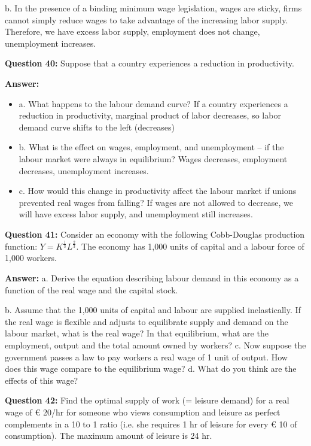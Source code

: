 \documentclass[a4paper, 11pt]{article}
\begin{document}
b. In the presence of a binding minimum wage legislation, wages are sticky, firms cannot simply reduce wages to take advantage of the increasing labor supply. Therefore, we have excess labor supply, employment does not change, unemployment increases.

\textbf{Question 40:} Suppose that a country experiences a reduction in productivity.

\textbf{Answer:}

\begin{itemize}
\item a. What happens to the labour demand curve? If a country experiences a reduction in productivity, marginal product of labor decreases, so labor demand curve shifts to the left (decreases)
\item b. What is the effect on wages, employment, and unemployment – if the labour market were always in equilibrium? Wages decreases, employment decreases, unemployment increases.
\item c. How would this change in productivity affect the labour market if unions prevented real wages from falling? If wages are not allowed to decrease, we will have excess labor supply, and unemployment still increases.
\end{itemize}

\textbf{Question 41:} Consider an economy with the following Cobb-Douglas production function: $Y = K^{\frac{1}{3}}L^{\frac{2}{3}}$. The economy has 1,000 units of capital and a labour force of 1,000 workers.

\textbf{Answer:}
a. Derive the equation describing labour demand in this economy as a function of the real wage and the capital stock.


b. Assume that the 1,000 units of capital and labour are supplied inelastically. If the real wage is flexible and adjusts to equilibrate supply and demand on the labour market, what is the real wage? In that equilibrium, what are the employment, output and the total amount owned by workers?
c. Now suppose the government passes a law to pay workers a real wage of 1 unit of output. How does this wage compare to the equilibrium wage?
d. What do you think are the effects of this wage?

\textbf{Question 42:} Find the optimal supply of work (= leisure demand) for a real wage of € 20/hr for someone who views consumption and leisure as perfect complements in a 10 to 1 ratio (i.e. she requires 1 hr of leisure for every € 10 of consumption). The maximum amount of leisure is 24 hr.
\end{document}
